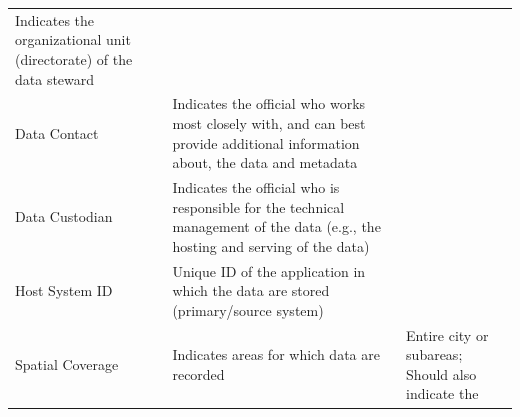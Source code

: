 \documentclass[
]{WileySix}
\begin{document}
\begin{longtable}[]{@{}lll@{}}
\begin{minipage}[t]{0.35\columnwidth}
Indicates the
organizational unit
(directorate) of the data
steward\strut
\end{minipage} & \begin{minipage}[t]{0.35\columnwidth}\raggedright
\strut
\end{minipage}\tabularnewline
\begin{minipage}[t]{0.22\columnwidth}\raggedright
Data Contact\strut
\end{minipage} & \begin{minipage}[t]{0.35\columnwidth}\raggedright
Indicates the official
who works most closely
with, and can best
provide additional
information about, the
data and metadata\strut
\end{minipage} & \begin{minipage}[t]{0.35\columnwidth}\raggedright
\strut
\end{minipage}\tabularnewline
\begin{minipage}[t]{0.22\columnwidth}\raggedright
Data Custodian\strut
\end{minipage} & \begin{minipage}[t]{0.35\columnwidth}\raggedright
Indicates the official
who is responsible for
the technical management
of the data (e.g., the
hosting and serving of
the data)\strut
\end{minipage} & \begin{minipage}[t]{0.35\columnwidth}\raggedright
\strut
\end{minipage}\tabularnewline
\begin{minipage}[t]{0.22\columnwidth}\raggedright
Host System ID\strut
\end{minipage} & \begin{minipage}[t]{0.35\columnwidth}\raggedright
Unique ID of the
application in which the
data are stored
(primary/source system)\strut
\end{minipage} & \begin{minipage}[t]{0.35\columnwidth}\raggedright
\strut
\end{minipage}\tabularnewline
\begin{minipage}[t]{0.22\columnwidth}\raggedright
Spatial
Coverage\strut
\end{minipage} & \begin{minipage}[t]{0.35\columnwidth}\raggedright
Indicates areas for which
data are recorded\strut
\end{minipage} & \begin{minipage}[t]{0.35\columnwidth}\raggedright
Entire city or subareas;
Should also indicate the

\end{minipage}
\end{longtable}
\end{document}
